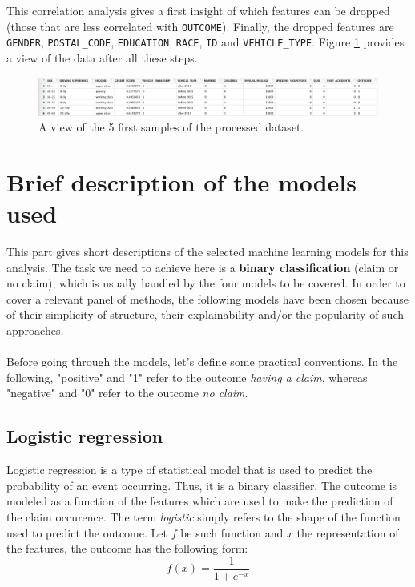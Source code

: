\documentclass[a4paper,11pt, titlepage]{article}
\begin{document}
\noindent This correlation analysis gives a first insight of which features can be dropped (those that are less correlated with {\tt OUTCOME}). Finally, the dropped features are {\tt GENDER}, {\tt POSTAL\_CODE}, {\tt EDUCATION}, {\tt RACE}, {\tt ID} and {\tt VEHICLE\_TYPE}. Figure \ref{fig:head-data} provides a view of the data after all these steps.\newline

\begin{figure}[h!]
    \centering
    \includegraphics[width=\textwidth]{head-data.png}
    \caption{A view of the 5 first samples of the processed dataset.}
    \label{fig:head-data}
\end{figure}


\section{Brief description of the models used} \label{models}

This part gives short descriptions of the selected machine learning models for this analysis. The task we need to achieve here is a \textbf{binary classification} (claim or no claim), which is usually handled by the four models to be covered. In order to cover a relevant panel of methods, the following models have been chosen because of their simplicity of structure, their explainability and/or the popularity of such approaches.\\
\\
\noindent Before going through the models, let's define some practical conventions. In the following, "positive" and "1" refer to the outcome \textsl{having a claim}, whereas "negative" and "0" refer to the outcome \textsl{no claim}. 

\subsection{Logistic regression}

Logistic regression is a type of statistical model that is used to predict the probability of an event occurring. Thus, it is a binary classifier. The outcome is modeled as a function of the features which are used to make the prediction of the claim occurence. The term \textsl{logistic} simply refers to the shape of the function used to predict the outcome. Let $f$ be such function and $x$ the representation of the features, the outcome has the following form:
\begin{equation*}
    f(x) = \dfrac{1}{1+e^{-x}}
\end{equation*}
\end{document}
